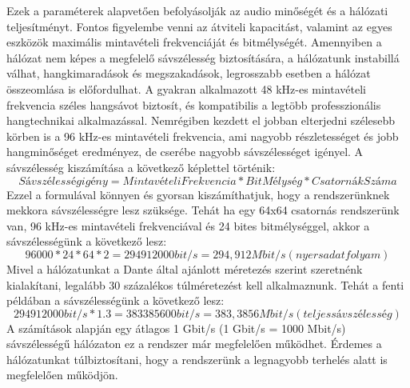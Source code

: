 Ezek a paraméterek alapvetően befolyásolják az audio minőségét és a hálózati teljesítményt.
Fontos figyelembe venni az átviteli kapacitást, valamint az egyes eszközök maximális mintavételi frekvenciáját és bitmélységét.
Amennyiben a hálózat nem képes a megfelelő sávszélesség biztosítására, a hálózatunk instabillá válhat, 
hangkimaradások és megszakadások, legrosszabb esetben a hálózat összeomlása is előfordulhat.
A gyakran alkalmazott 48 kHz-es mintavételi frekvencia széles hangsávot biztosít, és kompatibilis a legtöbb
professzionális hangtechnikai alkalmazással. 
Nemrégiben kezdett el jobban elterjedni szélesebb körben is a 96 kHz-es mintavételi frekvencia, ami
nagyobb részletességet és jobb hangminőséget eredményez, de cserébe nagyobb sávszélességet igényel.
A sávszélesség kiszámítása a következő képlettel történik:
\begin{equation}
	\label{eq:sávszélesség}
	Sávszélesség igény = MintavételiFrekvencia * BitMélység * CsatornákSzáma
\end{equation}
Ezzel a formulával könnyen és gyorsan kiszámíthatjuk, hogy a rendszerünknek mekkora sávszélességre lesz szüksége.
Tehát ha egy 64x64 csatornás rendszerünk van, 96 kHz-es mintavételi frekvenciával és 24 bites bitmélységgel,
akkor a sávszélességünk a következő lesz:
\begin{equation}
	\label{eq:sávszélesség}
	96000 * 24 * 64 * 2 = 294912000 bit/s = 294,912 Mbit/s (nyers adatfolyam)
\end{equation}
Mivel a hálózatunkat a Dante által ajánlott méretezés szerint szeretnénk kialakítani,
legalább 30 százalékos túlméretezést kell alkalmaznunk. Tehát a fenti példában a sávszélességünk a következő lesz:
\begin{equation}
	\label{eq:teljes-sávszélesség}
	294912000 bit/s * 1.3 = 383385600 bit/s = 383,3856 Mbit/s (teljes sávszélesség)
\end{equation}
A számítások alapján egy átlagos 1 Gbit/s (1 Gbit/s = 1000 Mbit/s) sávszélességű hálózaton ez a rendszer már megfelelően működhet.
Érdemes a hálózatunkat túlbiztosítani, hogy a rendszerünk a legnagyobb terhelés alatt is megfelelően működjön.
